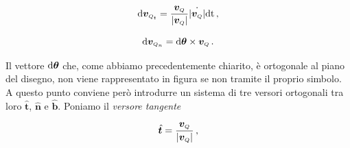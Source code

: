 \begin{equation}
{\rm d}{\bm v}_{\scriptscriptstyle{Q}_{\scriptscriptstyle{t}}}=
{{\bm v}_{\scriptscriptstyle{Q}}\over{
|{\bm v}_{\scriptscriptstyle{Q}}|}}
\dot{|{\bm v}_{\scriptscriptstyle{Q}}|}{\rm dt}\,,
	\label{e117}
\end{equation}

\begin{equation}
{\rm d}{\bm v}_{\scriptscriptstyle{Q}_{\scriptscriptstyle{n}}}=
 {\rm d}{\bm \theta}\times 
{\bm v}_{\scriptscriptstyle{Q}}\,. 
	\label{e118}
\end{equation}


\noindent Il vettore ${\rm d}{\bm \theta}$ che, come abbiamo
precedentemente chiarito, \`e
ortogonale al piano del disegno, non viene rappresentato in figura se non tramite il proprio simbolo.
A questo punto conviene per\`o introdurre un sistema di
tre versori ortogonali tra loro $\hat{\bm t}$, $\hat{\bm n}$ e $\hat{\bm b}$.
Poniamo il {\em versore tangente}

\begin{equation}
 \hat{\bm t}= {{{\bm v}_{\scriptscriptstyle{Q}}\over{
|{\bm v}_{\scriptscriptstyle{Q}}|}}}\,,
\label{e119}
\end{equation}

